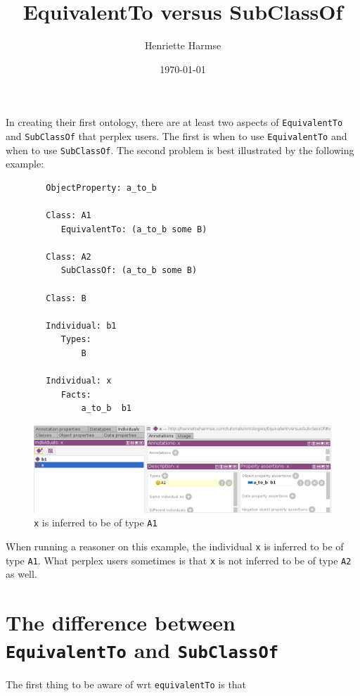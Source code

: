 \documentclass{amsart}
\title{EquivalentTo versus SubClassOf}
\author{Henriette Harmse}
\date{\today}
\begin{document}
  \maketitle
  
  In creating their first ontology, there are at least two aspects of \texttt{EquivalentTo} and \texttt{SubClassOf} that perplex users. The first is when to use \texttt{EquivalentTo} and when to use \texttt{SubClassOf}. The second problem is best illustrated by the following example:
  
  
\begin{small}
	\begin{verbatim} 
		ObjectProperty: a_to_b
		
		Class: A1
		   EquivalentTo: (a_to_b some B)
		
		Class: A2
		   SubClassOf: (a_to_b some B)
		
		Class: B
		
		Individual: b1
		   Types: 
		       B
		
		Individual: x
		   Facts:  
		       a_to_b  b1
	\end{verbatim}
\end{small}  


\begin{figure}
	\centering \includegraphics[trim = 0mm 0mm 0mm 0mm, clip, scale=0.4]{./images/xTypeOfA1.png}
	\caption{\texttt{x} is inferred to be of type \texttt{A1}}
\end{figure}
  
  When running a reasoner on this example, the individual \texttt{x} is inferred to be of type \texttt{A1}. What perplex users sometimes is that \texttt{x} is not inferred to be of type \texttt{A2} as well.
  
  
  \section{The difference between \texttt{EquivalentTo} and \texttt{SubClassOf}}
  The first thing to be aware of wrt \texttt{equivalentTo} is that 
\end{document}
